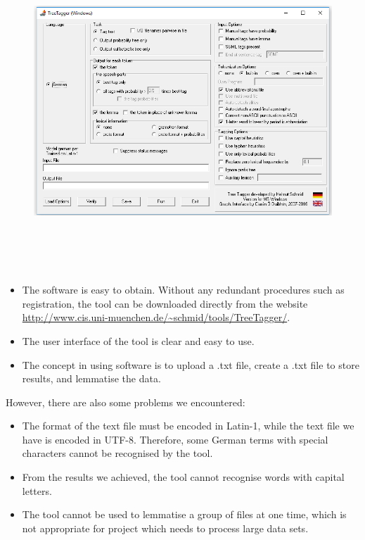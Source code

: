 \begin{figure}[h]
	\centering	
	\includegraphics[width=16cm, height=12cm]{Figs/TreeTaggerInterface}\\[1ex]
	\caption{}
	\label{fig:treeTaggerUI}
\end{figure} 

\begin{itemize}
	\item \textbf{} The software is easy to obtain. Without any redundant procedures such as registration, the tool can be downloaded directly from the website \url{http://www.cis.uni-muenchen.de/~schmid/tools/TreeTagger/}.
	\item \textbf{} The user interface of the tool is clear and easy to use.
	\item \textbf{} The concept in using software is to upload a .txt file, create a .txt file to store results, and lemmatise the data.	
\end{itemize}

However, there are also some problems we encountered:
\begin{itemize}
	\item \textbf{} The format of the text file must be encoded in Latin-1, while the text file we have is encoded in UTF-8. Therefore, some German terms with special characters cannot be recognised by the tool.
	\item \textbf{} From the results we achieved, the tool cannot recognise words with capital letters. 
	\item \textbf{} The tool cannot be used to lemmatise a group of files at one time, which is not appropriate for project which needs to process large data sets. 	
\end{itemize}

